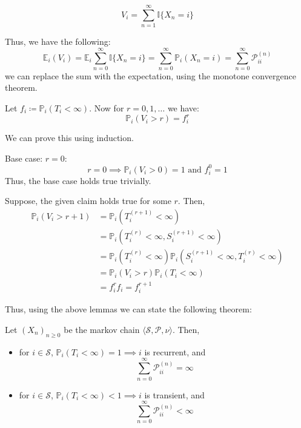 \begin{definition}
    \[
        V_i = \sum_{n=1}^{\infty} \mathbb{I} \{X_n = i\}
    \]
\end{definition}
Thus, we have the following:
\[
    \mathbb{E}_i (V_i) = \mathbb{E}_i \sum_{n=0}^{\infty} \mathbb{I} \{X_n = i\} = 
    \sum_{n=0}^{\infty} \mathbb{P}_i (X_n = i) = \sum _{n=0}^{\infty} \mathcal{P}_{ii}^{(n)}
\]
we can replace the sum with the expectation, using the monotone convergence theorem.
\begin{lemma}
    Let \(f_i \coloneqq \mathbb{P} _i(T_i < \infty )\). Now for \(r = 0,1,\dots \) we have:
    \[
        \mathbb{P} _i (V_i > r) = f_i^r
    \] 
\end{lemma}
\begin{lemmaproof}
    We can prove this using induction.
    
    Base case: \(r = 0\):
    \[
        r = 0 \implies  \mathbb{P} _i (V_i > 0) = 1 \text{ and }  f_i^0 = 1
    \]
    Thus, the base case holds true trivially.

    Suppose, the given claim holds true for some \(r\). Then,
    \[
        \begin{aligned}
            \mathbb{P} _i (V_i > r+1) &= \mathbb{P}_i (T_i^{(r+1)} < \infty ) \\
            &= \mathbb{P}_i (T_i^{(r)} < \infty, S_i^{(r+1)} < \infty) \\
            &= \mathbb{P}_i (T_i^{(r)} < \infty) \mathbb{P}_i (S_i^{(r+1)} < \infty, T_i^{(r)} < \infty) \\
            &= \mathbb{P} _i (V_i > r) \mathbb{P}_i (T_i < \infty) \\
            &= f_i^r f_i  = f_i^{r+1}
        \end{aligned}
    \] 
\end{lemmaproof}
Thus, using the above lemmas we can state the following theorem:
\begin{theorem}
    Let \((X_n)_{n \geq 0}\) be the markov chain \(\langle \mathcal{S} , \mathcal{P} , \nu \rangle\).
    Then,
    \begin{itemize}
        \item for \(i \in \mathcal{S} \), \(\mathbb{P}_i (T_i < \infty)  = 1 \implies i\) is recurrent, and
        \[
            \sum_{n = 0}^{\infty} \mathcal{P}_{ii}^{(n)} = \infty  
        \]
        \item for \(i \in \mathcal{S} \), \(\mathbb{P}_i (T_i < \infty)  < 1 \implies i\) is transient, and
        \[
            \sum_{n = 0}^{\infty} \mathcal{P}_{ii}^{(n)} < \infty
        \]
    \end{itemize}
\end{theorem}
